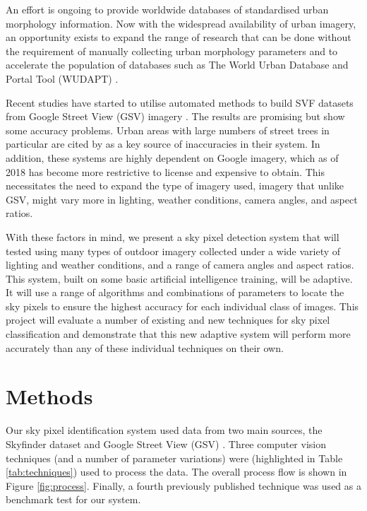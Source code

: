 \documentclass[final,3p,times,authoryear]{elsarticle}
\begin{document}
An effort is ongoing to provide worldwide databases of standardised urban morphology information. Now with the widespread availability of urban imagery, an opportunity exists to expand the range of research that can be done without the requirement of manually collecting urban morphology parameters and to accelerate the population of databases such as The World Urban Database and Portal Tool (WUDAPT) \citep{Mills2015}.

Recent studies have started to utilise automated methods to build SVF datasets from Google Street View (GSV) imagery \citep{Middel2018,Gong2018}. The results are promising but show some accuracy problems. Urban areas with large numbers of street trees in particular are cited by \cite{Gong2018} as a key source of inaccuracies in their system. In addition, these systems are highly dependent on Google imagery, which as of 2018 has become more restrictive to license and expensive to obtain. This necessitates the need to expand the type of imagery used, imagery that unlike GSV, might vary more in lighting, weather conditions, camera angles, and aspect ratios. 

With these factors in mind, we present a sky pixel detection system that will tested using many types of outdoor imagery collected under a wide variety of lighting and weather conditions, and a range of camera angles and aspect ratios. This system, built on some basic artificial intelligence training, will be adaptive. It will use a range of algorithms and combinations of parameters to locate the sky pixels to ensure the highest accuracy for each individual class of images. This project will evaluate a number of existing and new techniques for sky pixel classification and demonstrate that this new adaptive system will perform more accurately than any of these individual techniques on their own.



\section{Methods}\label{sec:Methods}
Our sky pixel identification system used data from two main sources, the Skyfinder dataset \citep{Mihail2016} and Google Street View (GSV) \citep{GoogleMaps2017b}. Three computer vision techniques (and a number of parameter variations) were (highlighted in Table \ref{tab:techniques}) used to process the data. The overall process flow is shown in Figure \ref{fig:process}. Finally, a fourth previously published technique was used as a benchmark test for our system.
\end{document}
